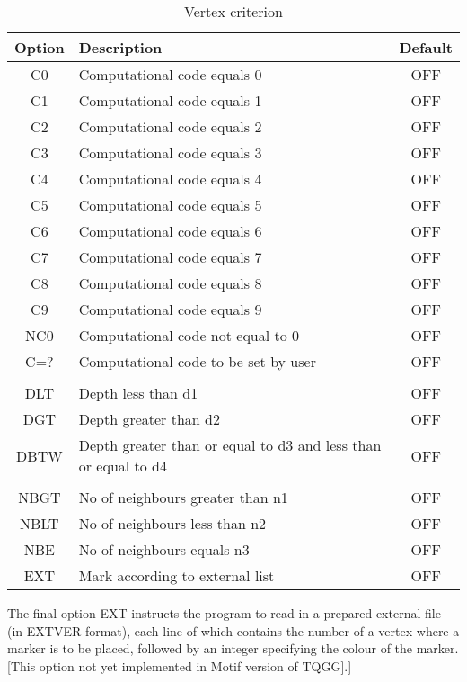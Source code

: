 \documentclass{article}
\begin{document}
\begin{table}[htb!]
 \caption{Vertex criterion}
\begin{center}
 \begin{tabular}{| c | l | c |}
	\hline
	Option & Description & Default\\
	\hline
	\hline	
	
	C0 & Computational code equals 0 & OFF\\ \hline
	C1 & Computational code equals 1 & OFF\\ \hline
	C2 & Computational code equals 2 & OFF\\ \hline
	C3 & Computational code equals 3 & OFF\\ \hline
	C4 & Computational code equals 4 & OFF\\ \hline
	C5 & Computational code equals 5 & OFF\\ \hline
	C6 & Computational code equals 6 & OFF\\ \hline
	C7 & Computational code equals 7 & OFF\\ \hline
	C8 & Computational code equals 8 & OFF\\ \hline
	C9 & Computational code equals 9 & OFF\\ \hline
	NC0 & Computational code not equal to 0 & OFF\\ \hline
	C=? & Computational code to be set by user & OFF\\ \hline
	 & & \\ \hline
	DLT & Depth less than d1 & OFF\\ \hline
	DGT & Depth greater than d2 & OFF\\ \hline
	DBTW & Depth greater than or equal to d3 and less than or equal to d4 & OFF\\ \hline
	 & & \\ \hline 
	NBGT & No of neighbours greater than n1 & OFF\\ \hline
	NBLT & No of neighbours less than n2 & OFF\\ \hline
	NBE & No of neighbours equals n3 & OFF\\ \hline
	EXT & Mark according to external list & OFF\\ \hline
 
 
 \end{tabular}
\end{center}
\end{table}




The final option EXT instructs the program to read in a prepared external file (in EXTVER format), each line of which contains the number of a vertex where a marker is to be placed, followed by an integer specifying the colour of the marker. [This option not yet implemented in Motif version of TQGG].]
\end{document}
